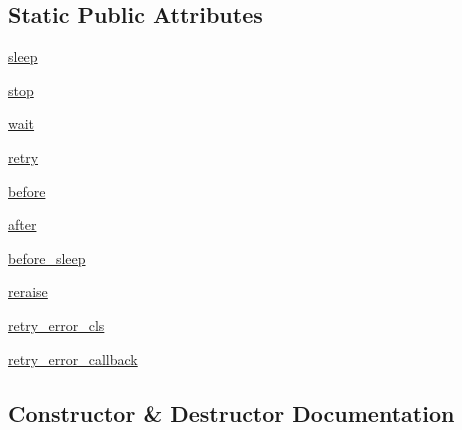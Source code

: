 \subsection*{Static Public Attributes}
\begin{DoxyCompactItemize}
\item 
\hyperlink{classpip_1_1__vendor_1_1tenacity_1_1BaseRetrying_a9d97fa089a33ae73adbdc338f11100a7}{sleep}
\item 
\hyperlink{classpip_1_1__vendor_1_1tenacity_1_1BaseRetrying_ae8283d304a9618d0216957317fa5eaed}{stop}
\item 
\hyperlink{classpip_1_1__vendor_1_1tenacity_1_1BaseRetrying_a95d8004fd93876c471b494e6d937fa4a}{wait}
\item 
\hyperlink{classpip_1_1__vendor_1_1tenacity_1_1BaseRetrying_aa6cadd235e48f7ef8f89e77a6acc3daf}{retry}
\item 
\hyperlink{classpip_1_1__vendor_1_1tenacity_1_1BaseRetrying_a09dd9fd66fdf26c183ef972cd2a576a7}{before}
\item 
\hyperlink{classpip_1_1__vendor_1_1tenacity_1_1BaseRetrying_a30a5819f77176f9a2c9ecade5c29e454}{after}
\item 
\hyperlink{classpip_1_1__vendor_1_1tenacity_1_1BaseRetrying_a486c28542b77067e5026a6b1cd6b2e7a}{before\+\_\+sleep}
\item 
\hyperlink{classpip_1_1__vendor_1_1tenacity_1_1BaseRetrying_a75520fa87ff6083c08e871460f495c4c}{reraise}
\item 
\hyperlink{classpip_1_1__vendor_1_1tenacity_1_1BaseRetrying_a9e985b4d3ee1bbae3085f0010631ea69}{retry\+\_\+error\+\_\+cls}
\item 
\hyperlink{classpip_1_1__vendor_1_1tenacity_1_1BaseRetrying_ac2db7468722e57ede5851fb9e0dbfc6f}{retry\+\_\+error\+\_\+callback}
\end{DoxyCompactItemize}


\subsection{Constructor \& Destructor Documentation}
\mbox{\label{classpip_1_1__vendor_1_1tenacity_1_1BaseRetrying_abe45da6852609c52fa8f89156fc96af2}} 
